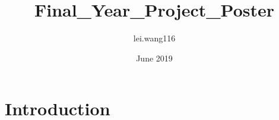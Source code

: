\documentclass{article}
\title{Final_Year_Project_Poster}
\author{lei.wang116 }
\date{June 2019}
\begin{document}
\maketitle

\section{Introduction}
\end{document}
